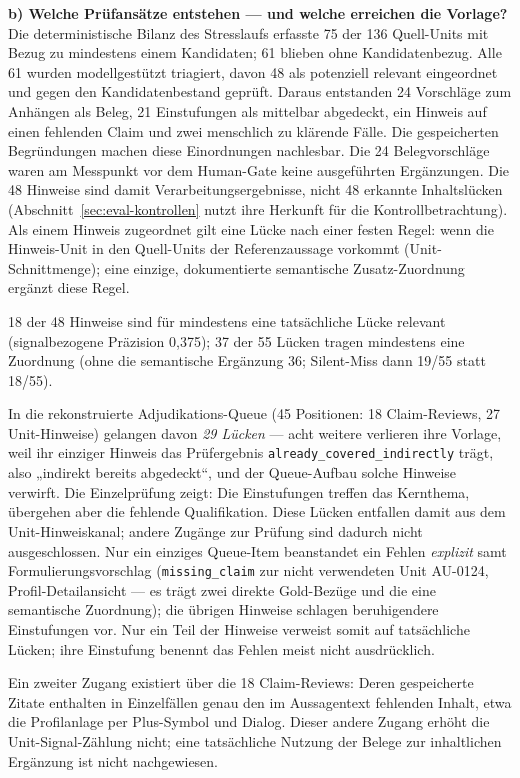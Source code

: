 \textbf{b) Welche Prüfansätze entstehen --- und welche erreichen
die Vorlage?} Die deterministische Bilanz des Stresslaufs erfasste
75 der 136 Quell-Units mit Bezug zu mindestens einem Kandidaten;
61 blieben ohne Kandidatenbezug. Alle 61 wurden modellgestützt triagiert,
davon 48 als potenziell relevant eingeordnet und gegen den
Kandidatenbestand geprüft. Daraus entstanden 24 Vorschläge zum
Anhängen als Beleg, 21 Einstufungen als mittelbar abgedeckt, ein
Hinweis auf einen fehlenden Claim und zwei menschlich zu klärende
Fälle. Die gespeicherten Begründungen machen diese Einordnungen
nachlesbar. Die 24 Belegvorschläge waren am Messpunkt vor dem
Human-Gate keine ausgeführten Ergänzungen. Die 48 Hinweise sind
damit Verarbeitungsergebnisse, nicht 48 erkannte Inhaltslücken
(Abschnitt~\ref{sec:eval-kontrollen} nutzt ihre Herkunft für die Kontrollbetrachtung).
Als einem Hinweis zugeordnet gilt eine Lücke nach einer festen
Regel: wenn die Hinweis-Unit in den Quell-Units der
Referenzaussage vorkommt (Unit-Schnittmenge); eine einzige,
dokumentierte semantische Zusatz-Zuordnung ergänzt diese Regel.

18 der 48 Hinweise sind
für mindestens eine tatsächliche Lücke relevant (signalbezogene
Präzision 0{,}375); 37 der 55 Lücken tragen mindestens eine
Zuordnung (ohne die semantische Ergänzung 36; Silent-Miss dann
19/55 statt 18/55).

In die rekonstruierte Adjudikations-Queue (45
Positionen: 18 Claim-Reviews, 27 Unit-Hinweise) gelangen davon
\emph{29 Lücken} --- acht weitere verlieren ihre Vorlage, weil ihr
einziger Hinweis das Prüfergebnis \texttt{already\_covered\_indirectly}
trägt, also „indirekt bereits abgedeckt``, und der Queue-Aufbau
solche Hinweise verwirft. Die Einzelprüfung zeigt: Die Einstufungen
treffen das Kernthema, übergehen aber die fehlende Qualifikation.
Diese Lücken entfallen damit aus dem Unit-Hinweiskanal; andere
Zugänge zur Prüfung sind dadurch nicht ausgeschlossen. Nur ein
einziges Queue-Item beanstandet ein Fehlen \emph{explizit} samt
Formulierungsvorschlag (\texttt{missing\_claim} zur nicht
verwendeten Unit AU-0124, Profil-Detailansicht --- es trägt zwei
direkte Gold-Bezüge und die eine semantische Zuordnung); die
übrigen Hinweise schlagen beruhigendere Einstufungen vor.
Nur ein Teil der Hinweise verweist somit auf tatsächliche Lücken;
ihre Einstufung benennt das Fehlen meist nicht ausdrücklich.

Ein zweiter Zugang existiert über die 18
Claim-Reviews: Deren gespeicherte Zitate enthalten in Einzelfällen
genau den im Aussagentext fehlenden Inhalt, etwa die Profilanlage
per Plus-Symbol und Dialog. Dieser andere Zugang erhöht die
Unit-Signal-Zählung nicht; eine tatsächliche Nutzung der Belege zur
inhaltlichen Ergänzung ist nicht nachgewiesen.

